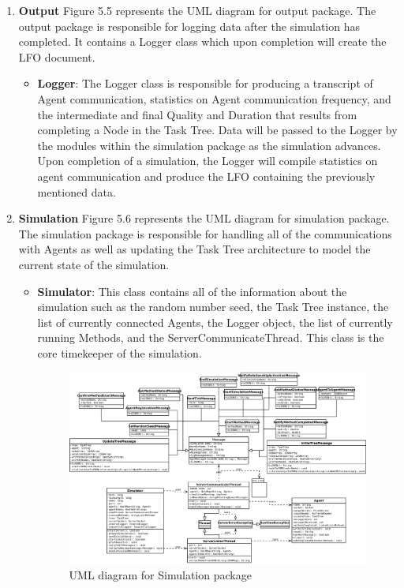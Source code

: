 \begin{enumerate}
\item \textbf{Output} Figure 5.5 represents the UML diagram for output package. The output package is responsible for logging data after the simulation has completed. It contains a Logger class which upon completion will create the LFO document. \\

\begin{itemize}
\item \textbf{Logger}: The Logger class is responsible for producing a  transcript of Agent communication, statistics on Agent communication frequency, and the intermediate and final Quality and Duration that results from completing a Node in the Task Tree. Data will be passed to the Logger by the modules within the simulation package as the simulation advances. Upon completion of a simulation, the Logger will compile statistics on agent communication and produce the LFO containing the previously mentioned data. \\
\end{itemize}

\item \textbf{Simulation}  Figure 5.6 represents the UML diagram for simulation package. The simulation package is responsible for handling all of the communications with Agents as well as updating the Task Tree architecture to model the current state of the simulation. \\

\begin{itemize}
\item \textbf{Simulator}: This class contains all of the information about the simulation such as the random number seed, the Task Tree instance, the list of currently connected Agents, the Logger object, the list of currently running Methods, and the ServerCommunicateThread. This class is the core timekeeper of the simulation. \\

\begin{figure}[H]
\centering
\includegraphics[width=7.0in]{figs/simulationUML}
\caption{UML diagram for Simulation package}
\label{fig:Simulation}
\end{figure}




\end{itemize}
\end{enumerate}
